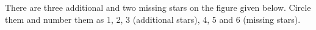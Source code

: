 There are three additional and two missing stars on the figure given below.
Circle them and number them as 1, 2, 3 (additional stars), 4, 5 and 6 (missing
stars).

